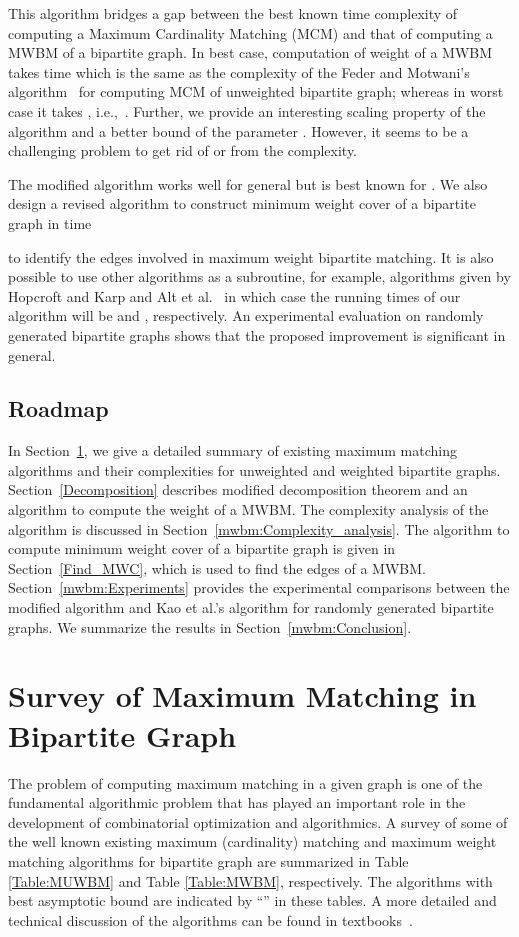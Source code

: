 \documentclass[runningheads,a4paper]{llncs}
\begin{document}
This algorithm bridges a gap between the best known time complexity of computing a Maximum Cardinality Matching (MCM) and that of computing a MWBM of a bipartite graph.
In best case, computation of weight of a MWBM takes 
 time which is the same as the complexity of the Feder and Motwani's algorithm~\cite{feder95} for computing MCM of unweighted bipartite graph;  whereas
in worst case it takes , i.e.,\ . 
Further, we provide an interesting scaling property of the algorithm and a better bound of the parameter .
However, it seems to be a challenging problem to get rid of  or  from the complexity.



The modified algorithm works well for general  but is best known for
. We also design a revised algorithm to construct
minimum weight cover of a bipartite graph in time  

to identify the edges involved in maximum weight bipartite matching.
It is also possible to use other algorithms as a subroutine,
for example, algorithms given by Hopcroft and Karp \cite{hopcroft73} and
Alt et al.~\cite{alt91} in which case the running times of our algorithm will be  and 
, respectively.
An experimental evaluation on randomly generated bipartite
graphs shows that the proposed improvement is significant in general.
\subsection{Roadmap}
In Section~\ref{mwbm:Survey},
we give a detailed summary of existing maximum matching algorithms and
their complexities for unweighted and weighted bipartite graphs.
Section~\ref{Decomposition} describes modified decomposition theorem and an
algorithm to compute the weight of a MWBM. The complexity analysis of the
algorithm is discussed in Section~\ref{mwbm:Complexity_analysis}. The algorithm to compute minimum weight cover of a bipartite graph is given in Section~\ref{Find_MWC}, which is used to find the edges of a MWBM. 
Section~\ref{mwbm:Experiments} provides the experimental comparisons between the modified algorithm and Kao et al.'s algorithm for randomly generated bipartite graphs.
We summarize the results in Section~\ref{mwbm:Conclusion}.

\section[Survey of Maximum Matching in Bipartite Graph]{Survey of Maximum Matching in Bipartite Graph}
\label{mwbm:Survey}
The problem of computing maximum matching in a given graph is one of
the fundamental algorithmic problem that has played an important role
in the development of combinatorial optimization and algorithmics.
A survey of some of the well known existing maximum (cardinality) matching and maximum weight  matching algorithms for bipartite graph are summarized in
Table \ref{Table:MUWBM}  and Table \ref{Table:MWBM}, respectively.
The algorithms with best asymptotic bound are indicated by ``''
in these tables. A more detailed and technical discussion of the algorithms can be found
in textbooks~\cite{korte07,schrijver03,douglas00}.
\end{document}
